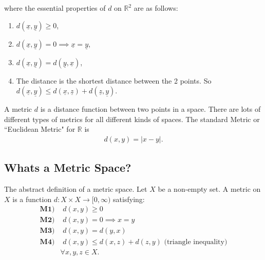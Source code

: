 \documentclass[10pt]{article}
\begin{document}
\begin{center}
\end{center}
where the essential properties of $d$ on $\mathbb{R}^{2}$ are as follows:
\begin{enumerate}
    \item $d(\underline{x},\underline{y})\geq0$,
    \item $d(\underline{x},\underline{y})=0\implies\underline{x}=\underline{y}$,
    \item $d(\underline{x},\underline{y})=d(\underline{y},\underline{x})$,
    \item The distance is the shortest distance between the 2 points. So $d(\underline{x},\underline{y})\leq d(\underline{x},\underline{z})+d(\underline{z},\underline{y})$.
\end{enumerate}

A metric $d$ is a distance function between two points in a space. There are lots of different types of metrics for all different kinds of spaces. The standard Metric or ``Euclidean Metric" for $\mathbb{R}$ is
\begin{align*}
    d(x,y)=|x-y|.
\end{align*}

\subsection{Whats a Metric Space?}
The abstract definition of a metric space. Let $X$ be a non-empty set. A metric on $X$ is a function $d:X\times X\to[0,\infty)$ satisfying:
\begin{align*}
    \textbf{M1)}&\,\,d(x,y)\geq0\\
    \textbf{M2)}&\,\,d(x,y)=0\implies x=y\\
    \textbf{M3)}&\,\,d(x,y)=d(y,x)\\
    \textbf{M4)}&\,\,d(x,y)\leq d(x,z)+d(z,y)\text{ (triangle inequality)}\\
    &\forall x,y,z\in X.
\end{align*}
\end{document}

